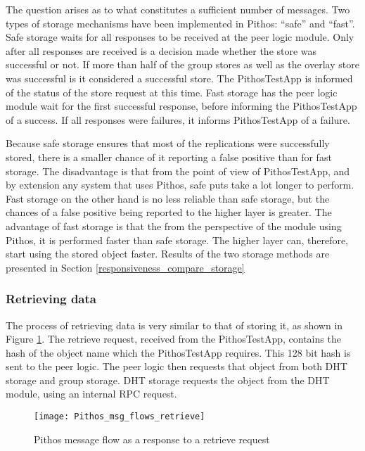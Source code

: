 The question arises as to what constitutes a sufficient number of messages. Two types of storage mechanisms have been implemented in Pithos: ``safe'' and ``fast''. Safe storage waits for all responses to be received at the peer logic module. Only after all responses are received is a decision made whether the store was successful or not. If more than half of the group stores as well as the overlay store was successful is it considered a successful store. The PithosTestApp is informed of the status of the store request at this time. Fast storage has the peer logic module wait for the first successful response, before informing the PithosTestApp of a success. If all responses were failures, it informs PithosTestApp of a failure.

Because safe storage ensures that most of the replications were successfully stored, there is a smaller chance of it reporting a false positive than for fast storage. The disadvantage is that from the point of view of PithosTestApp, and by extension any system that uses Pithos, safe puts take a lot longer to perform. Fast storage on the other hand is no less reliable than safe storage, but the chances of a false positive being reported to the higher layer is greater. The advantage of fast storage is that the from the perspective of the module using Pithos, it is performed faster than safe storage. The higher layer can, therefore, start using the stored object faster. Results of the two storage methods are presented in Section \ref{responsiveness_compare_storage}

    \subsubsection{Retrieving data}
    \label{retrieve_implementation}

    The process of retrieving data is very similar to that of storing it, as shown in Figure \ref{fig_pithos_msg_flow_retrieve}. The retrieve request, received from the PithosTestApp, contains the hash of the object name which the PithosTestApp requires. This 128 bit hash is sent to the peer logic. The peer logic then requests that object from both DHT storage and group storage. DHT storage requests the object from the DHT module, using an internal RPC request.

\begin{figure}[htbp]
 \centering
 \texttt{[image: Pithos\_msg\_flows\_retrieve]}
 \caption{Pithos message flow as a response to a retrieve request}
 \label{fig_pithos_msg_flow_retrieve}
\end{figure}

